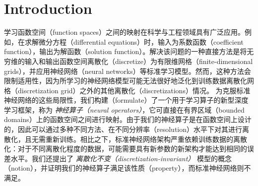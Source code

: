 


\section{Introduction}
\label{sec:I}
学习函数空间（function spaces）之间的映射在科学与工程领域具有广泛应用。例如，在求解微分方程（differential equations）时，输入为系数函数（coefficient function），输出为解函数（solution function）。解决该问题的一种直接方法是将无穷维的输入和输出函数空间离散化（discretize）为有限维网格（finite-dimensional grids），并应用神经网络（neural networks）等标准学习模型。然而，这种方法会限制适用性，因为所学习的神经网络模型可能无法很好地泛化到训练数据离散化网格（discretization grid）之外的其他离散化（discretizations）情况。
为克服标准神经网络的这些局限性，我们构建（formulate）了一个用于学习算子的新型深度学习框架，称为 {\em 神经算子（neural operators）}，它可直接在有界区域（bounded domains）上的函数空间之间进行映射。由于我们的神经算子是在函数空间上设计的，因此可以通过多种不同方法、在不同分辨率（resolution）水平下对其进行离散化，且无需重新训练。相比之下，标准神经网络架构严重依赖训练数据的离散化：对于不同离散化程度的数据，可能需要具有新参数的新架构才能达到相同的误差水平。我们还提出了 {\em 离散化不变（discretization-invariant）} 模型的概念（notion），并证明我们的神经算子满足该性质（property），而标准神经网络则不满足。
